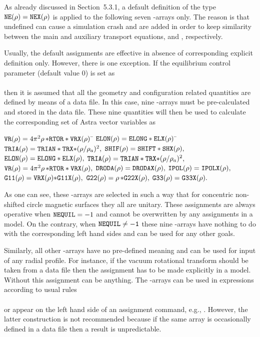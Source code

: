 As already discussed in Section~5.3.1, a default definition of the type 
${\tt NE}(\rho)={\tt NEX}({\rho})$ is applied to the following seven
-arrays  only. 
The reason is that undefined  can cause a
simulation crash and  are added in order to keep
similarity between the main and auxiliary transport equations, 
and , respectively. 

Usually, the default assignments are effective in absence of
corresponding explicit definition only.
However, there is one exception.
If the equilibrium control parameter  (default value 0) is
set as \\
\hspace*{2cm}\\
then it is assumed that all the geometry and configuration related
quantities are defined by means of a data file. 
In this case, nine -arrays  must be pre-calculated and stored in the data file.  
These nine quantities will then be used to calculate the corresponding
set of Astra vector variables as
\begin{tabbing}
${\tt VR}(\rho)=4\pi^2\rho\,{\tt *RTOR*VRX}(\rho)$	\=
${\tt ELON}(\rho)={\tt ELONG*ELX}(\rho)$			\=
${\tt TRIA}(\rho)={\tt TRIAN*TRX*}(\rho/\rho_a)^2,$	\kill
${\tt SHIF}(\rho)={\tt SHIFT*SHX}(\rho),$			\>
${\tt ELON}(\rho)={\tt ELONG*ELX}(\rho),$			\>
${\tt TRIA}(\rho)={\tt TRIAN*TRX*}(\rho/\rho_a)^2,$	\\
${\tt VR}(\rho)=4\pi^2\rho\,{\tt *RTOR*VRX}(\rho),$	\>
${\tt DRODA}(\rho)={\tt DRODAX}(\rho),$			\>
${\tt IPOL}(\rho)={\tt IPOLX}(\rho),$			\\
${\tt G11}(\rho)={\tt VRX}(\rho){\tt *G11X}(\rho),$	\>
${\tt G22}(\rho)=\rho\,{\tt *G22X}(\rho),$	\>
${\tt G33}(\rho)={\tt G33X}(\rho).$
\end{tabbing}
As one can see, these -arrays are selected in such a way
that for concentric non-shifted circle magnetic surfaces they all are
unitary. 
These assignments are always operative when ${\tt NEQUIL}=-1$ and cannot
be overwritten by any assignments in a model.
On the contrary, when $\tt NEQUIL\neq -1$ these nine -arrays have
nothing to do with the corresponding left hand sides and can be used for
any other goals.

Similarly, all other -arrays have no pre-defined meaning and can
be used for input of any radial profile. 
For instance, if the vacuum rotational transform  should be
taken from a data file then the assignment  has to be
made explicitly in a model. 
Without this assignment  can be anything.
The -arrays can be used in expressions according to usual rules
\\
\hspace*{2cm}
\\
or appear on the left hand side of an assignment command,
e.g., .
However, the latter construction is not recommended because if the same
array  is occasionally defined in a data file then a result is
unpredictable. 

